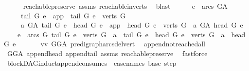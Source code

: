 \begin{isabellebody}
\ \ \ \ \isamarkupfalse%
\ reachable{}{\isacharunderscore}{\kern0pt}preserve\ assms\ reachable{}{\isacharunderscore}{\kern0pt}in{\isacharunderscore}{\kern0pt}verts{\isacharparenleft}{\kern0pt}{}{\isacharparenright}{\kern0pt}\ \isamarkupfalse%
\ blast\ \ \isanewline
\ \ \isamarkupfalse%
\ {\isachardoublequoteopen}{\isacharbraceleft}{\kern0pt}e\ {\isasymin}\ arcs\ G{\isacharunderscore}{\kern0pt}A{\isachardot}{\kern0pt}\isanewline
\ \ \ \ \ {\isacharparenleft}{\kern0pt}tail\ G\ e\ {\isacharequal}{\kern0pt}\ app\ {\isasymor}\ tail\ G\ e\ {\isasymin}\ verts\ G{\isacharparenright}{\kern0pt}\ {\isasymand}\isanewline
\ \ \ \ \ a\ {\isasymrightarrow}\isactrlsup {\isacharplus}{\kern0pt}\isactrlbsub G{\isacharunderscore}{\kern0pt}A\isactrlesub \ tail\ G\ e\ {\isasymand}\ {\isacharparenleft}{\kern0pt}head\ G\ e\ {\isacharequal}{\kern0pt}\ app\ {\isasymor}\ head\ G\ e\ {\isasymin}\ verts\ G{\isacharparenright}{\kern0pt}\ {\isasymand}\ a\ {\isasymrightarrow}\isactrlsup {\isacharplus}{\kern0pt}\isactrlbsub G{\isacharunderscore}{\kern0pt}A\isactrlesub \ head\ G\ e{\isacharbraceright}{\kern0pt}\ {\isacharequal}{\kern0pt}\isanewline
\ \ \ \ {\isacharbraceleft}{\kern0pt}e\ {\isasymin}\ arcs\ G{\isachardot}{\kern0pt}\ tail\ G\ e\ {\isasymin}\ verts\ G\ {\isasymand}\ a\ {\isasymrightarrow}\isactrlsup {\isacharplus}{\kern0pt}\ tail\ G\ e\ {\isasymand}\ head\ G\ e\ {\isasymin}\ verts\ G\ {\isasymand}\ a\ {\isasymrightarrow}\isactrlsup {\isacharplus}{\kern0pt}\ head\ G\ e{\isacharbraceright}{\kern0pt}\ {\isachardoublequoteclose}\isanewline
\ \ \ \ \isamarkupfalse%
\ vv\ GG{\isacharunderscore}{\kern0pt}A\ pre{\isacharunderscore}{\kern0pt}digraph{\isachardot}{\kern0pt}arcs{\isacharunderscore}{\kern0pt}del{\isacharunderscore}{\kern0pt}vert\ \isamarkupfalse%
\ append{\isacharunderscore}{\kern0pt}not{\isacharunderscore}{\kern0pt}reached{\isacharunderscore}{\kern0pt}all\isanewline
\ \ \ \ \isamarkupfalse%
\ GG{\isacharunderscore}{\kern0pt}A\ append{\isacharunderscore}{\kern0pt}head\ append{\isacharunderscore}{\kern0pt}tail\ assms\ reachable{}{\isacharunderscore}{\kern0pt}preserve\ \isamarkupfalse%
\ fastforce\ \isanewline
{}\isamarkupfalse%
%
\endisatagproof
{\isafoldproof}%
%
\isadelimproof
\isanewline
%
\endisadelimproof
\isanewline
\isanewline
{}\isamarkupfalse%
\ blockDAG{\isacharunderscore}{\kern0pt}induct{\isacharunderscore}{\kern0pt}append{\isacharbrackleft}{\kern0pt}consumes\ {}{\isacharcomma}{\kern0pt}\ case{\isacharunderscore}{\kern0pt}names\ base\ step{\isacharbrackright}{\kern0pt}{\isacharcolon}{\kern0pt}\isanewline

\end{isabellebody}
